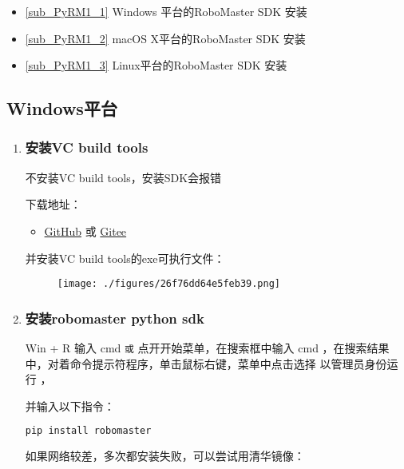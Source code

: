 
\begin{itemize}
\item \autoref{sub_PyRM1_1} Windows 平台的RoboMaster SDK 安装
\item \autoref{sub_PyRM1_2} macOS X平台的RoboMaster SDK 安装
\item \autoref{sub_PyRM1_3} Linux平台的RoboMaster SDK 安装
\end{itemize}

\subsection{Windows平台}\label{sub_PyRM1_1}
\begin{enumerate}
\item \subsubsection{安装VC build tools}
不安装VC build tools，安装SDK会报错

下载地址：\begin{itemize}
\item \href{https://github.com/dji-sdk/robomaster-sdk}{GitHub} 或 \href{https://gitee.com/xitinglin/RoboMaster-SDK}{Gitee}
\end{itemize}

并安装VC build tools的exe可执行文件：

\begin{figure}[ht]
\centering
\texttt{[image: ./figures/26f76dd64e5feb39.png]}
\caption{} \label{fig_PyRM1_1}
\end{figure}

\item \subsubsection{安装robomaster python sdk}
Win + R 输入 cmd 
\verb|或|
点开开始菜单，在搜索框中输入 cmd ，在搜索结果中，对着命令提示符程序，单击鼠标右键，菜单中点击选择 以管理员身份运行 ，

并输入以下指令：

\begin{lstlisting}[language=bash]
pip install robomaster
\end{lstlisting}

如果网络较差，多次都安装失败，可以尝试用清华镜像：


\end{enumerate}
